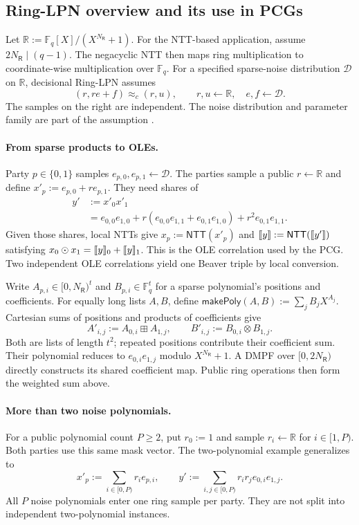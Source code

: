 \subsection{Ring-LPN overview and its use in PCGs}\label{subsec:ringlpn}

Let $\mathbb R:=\mathbb F_q[X]/(X^{N_{\mathsf R}}+1)$.
For the NTT-based application, assume $2N_{\mathsf R}\mid(q-1)$.
The negacyclic NTT then maps ring multiplication to coordinate-wise
multiplication over $\mathbb F_q$.
For a specified sparse-noise distribution $\mathcal D$ on $\mathbb R$,
decisional Ring-LPN assumes
\[
 (r,re+f)\approx_c(r,u),
 \qquad r,u\gets\mathbb R,\quad e,f\gets\mathcal D.
\]
The samples on the right are independent. The noise distribution and
parameter family are part of the assumption \cite{boyle2020efficient}.

\paragraph{From sparse products to OLEs.}
Party $p\in\{0,1\}$ samples $e_{p,0},e_{p,1}\gets\mathcal D$.
The parties sample a public $r\gets\mathbb R$ and define
$x'_p:=e_{p,0}+re_{p,1}$. They need shares of
\begin{align*}
 y'&:=x'_0x'_1\\
   &=e_{0,0}e_{1,0}
     +r(e_{0,0}e_{1,1}+e_{0,1}e_{1,0})
     +r^2e_{0,1}e_{1,1}.
\end{align*}
Given those shares, local NTTs give $x_p:=\mathsf{NTT}(x'_p)$ and
$\share y:=\mathsf{NTT}(\share{y'})$ satisfying
$x_0\odot x_1=\share y_0+\share y_1$.
This is the OLE correlation used by the PCG. Two independent OLE
correlations yield one Beaver triple by local conversion.

Write $A_{p,i}\in[0,N_{\mathsf R})^t$ and
$B_{p,i}\in\mathbb F_q^t$ for a sparse polynomial's
positions and coefficients. For equally long lists $A,B$, define
$\mathsf{makePoly}(A,B):=\sum_j B_jX^{A_j}$.
Cartesian sums of positions and products of coefficients give
\[
 A'_{i,j}:=A_{0,i}\boxplus A_{1,j},\qquad
 B'_{i,j}:=B_{0,i}\otimes B_{1,j}.
\]
Both are lists of length $t^2$; repeated positions contribute their
coefficient sum. Their polynomial reduces to $e_{0,i}e_{1,j}$ modulo
$X^{N_{\mathsf R}}+1$.
A DMPF over $[0,2N_{\mathsf R})$ directly constructs its shared coefficient
map. Public ring operations then form the weighted sum above.

\paragraph{More than two noise polynomials.}
For a public polynomial count $P\geq2$, put $r_0:=1$ and sample
$r_i\gets\mathbb R$ for $i\in[1,P)$. Both parties use this same mask vector.
The two-polynomial example generalizes to
\[
 x'_p:=\sum_{i\in[0,P)}r_i e_{p,i},
 \qquad
 y':=\sum_{i,j\in[0,P)}r_i r_j e_{0,i}e_{1,j}.
\]
All $P$ noise polynomials enter one ring sample per party. They are not
split into independent two-polynomial instances.

